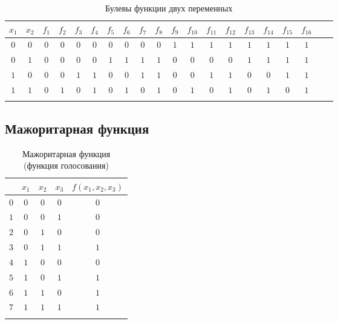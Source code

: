 {
    \setlength{\tabcolsep}{3pt}
    \renewcommand*{\arraystretch}{1.5}
    \begin{longtable}{|c|c!{\vrule width 1.2pt}Sc|c|c|c|c|c|c|c|c|c|c|c|c|c|c|c|c|}
        \hline
        \(x_1\) & \(x_2\) & \(f_1\) & \(f_2\) & \(f_3\) & \(f_4\) & \(f_5\) & \(f_6\) & \(f_7\) & \(f_8\) & \(f_9\) & \(f_{10}\) & \(f_{11}\) & \(f_{12}\) & \(f_{13}\) & \(f_{14}\) & \(f_{15}\) & \(f_{16}\) \\
        \hline
        \(0\)   & \(0\)   & \(0\)   & \(0\)   & \(0\)   & \(0\)   & \(0\)   & \(0\)   & \(0\)   & \(0\)   & \(1\)   & \(1\)      & \(1\)      & \(1\)      & \(1\)      & \(1\)      & \(1\)      & \(1\)      \\
        \hline
        \(0\)   & \(1\)   & \(0\)   & \(0\)   & \(0\)   & \(0\)   & \(1\)   & \(1\)   & \(1\)   & \(1\)   & \(0\)   & \(0\)      & \(0\)      & \(0\)      & \(1\)      & \(1\)      & \(1\)      & \(1\)      \\
        \hline
        \(1\)   & \(0\)   & \(0\)   & \(0\)   & \(1\)   & \(1\)   & \(0\)   & \(0\)   & \(1\)   & \(1\)   & \(0\)   & \(0\)      & \(1\)      & \(1\)      & \(0\)      & \(0\)      & \(1\)      & \(1\)      \\
        \hline
        \(1\)   & \(1\)   & \(0\)   & \(1\)   & \(0\)   & \(1\)   & \(0\)   & \(1\)   & \(0\)   & \(1\)   & \(0\)   & \(1\)      & \(0\)      & \(1\)      & \(0\)      & \(1\)      & \(0\)      & \(1\)      \\
        \hline
        \caption{Булевы функции двух переменных}
    \end{longtable}
}

\subsection{Мажоритарная функция}

{
    \renewcommand*{\arraystretch}{1.5}
    \begin{longtable}{|c|c|c|c|c|}
        \hline
              & \(x_1\) & \(x_2\) & \(x_3\) & \(f(x_1, x_2, x_3)\) \\
        \hline
        \(0\) & \(0\)   & \(0\)   & \(0\)   & \(0\)                \\
        \hline
        \(1\) & \(0\)   & \(0\)   & \(1\)   & \(0\)                \\
        \hline
        \(2\) & \(0\)   & \(1\)   & \(0\)   & \(0\)                \\
        \hline
        \(3\) & \(0\)   & \(1\)   & \(1\)   & \(1\)                \\
        \hline
        \(4\) & \(1\)   & \(0\)   & \(0\)   & \(0\)                \\
        \hline
        \(5\) & \(1\)   & \(0\)   & \(1\)   & \(1\)                \\
        \hline
        \(6\) & \(1\)   & \(1\)   & \(0\)   & \(1\)                \\
        \hline
        \(7\) & \(1\)   & \(1\)   & \(1\)   & \(1\)                \\
        \hline
        \caption{Мажоритарная функция (функция голосования)}
    \end{longtable}
}

